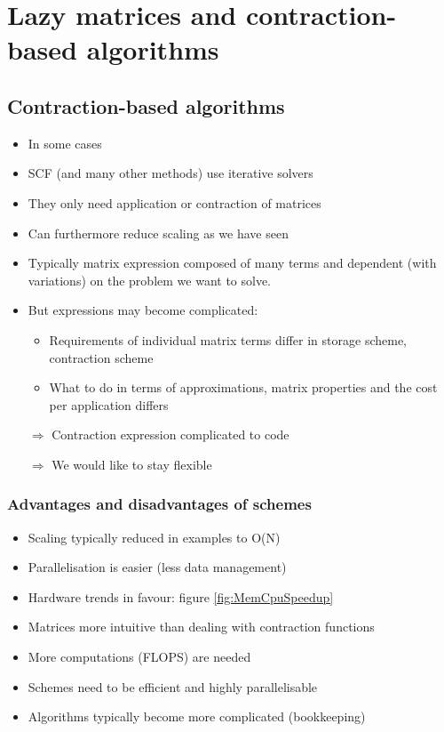 \chapter{Lazy matrices and contraction-based algorithms}

\section{Contraction-based algorithms}

\begin{itemize}
	\item In some cases 
	\item SCF (and many other methods) use iterative solvers
	\item They only need application or contraction of matrices
	\item Can furthermore reduce scaling as we have seen
	\item Typically matrix expression composed of many terms and dependent (with variations) on the problem we want to solve.
	\item But expressions may become complicated:
		\begin{itemize}
			\item Requirements of individual matrix terms differ in storage scheme, contraction scheme
			\item What to do in terms of approximations, matrix properties and the cost per application differs
		\end{itemize}
	\item[$\Rightarrow$] Contraction expression complicated to code
	\item[$\Rightarrow$] We would like to stay flexible
\end{itemize}

\subsection{Advantages and disadvantages of \contraction schemes}
\begin{itemize}
	\item Scaling typically reduced in examples to O(N)
	\item Parallelisation is easier (less data management)
	\item Hardware trends in favour: figure \vref{fig:MemCpuSpeedup}
	\item Matrices more intuitive than dealing with contraction functions
	\item More computations (FLOPS) are needed
	\item Schemes need to be efficient and highly parallelisable
	\item Algorithms typically become more complicated (bookkeeping)
\end{itemize}


